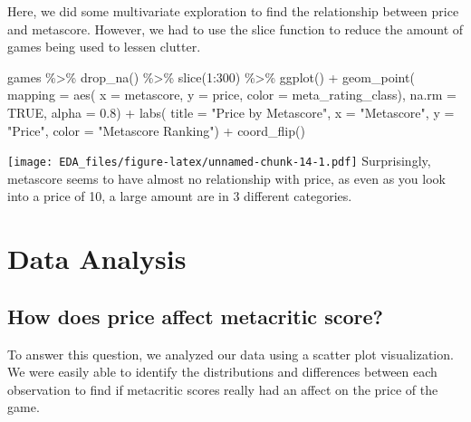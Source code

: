 \documentclass[
]{article}
\newenvironment{Shaded}{\begin{snugshade}}{\end{snugshade}}
\newcommand{\AttributeTok}[1]{\textcolor[rgb]{0.77,0.63,0.00}{#1}}
\newcommand{\ConstantTok}[1]{\textcolor[rgb]{0.00,0.00,0.00}{#1}}
\newcommand{\DecValTok}[1]{\textcolor[rgb]{0.00,0.00,0.81}{#1}}
\newcommand{\FloatTok}[1]{\textcolor[rgb]{0.00,0.00,0.81}{#1}}
\newcommand{\FunctionTok}[1]{\textcolor[rgb]{0.00,0.00,0.00}{#1}}
\newcommand{\NormalTok}[1]{#1}
\newcommand{\SpecialCharTok}[1]{\textcolor[rgb]{0.00,0.00,0.00}{#1}}
\newcommand{\StringTok}[1]{\textcolor[rgb]{0.31,0.60,0.02}{#1}}
\begin{document}
Here, we did some multivariate exploration to find the relationship
between price and metascore. However, we had to use the slice function
to reduce the amount of games being used to lessen clutter.

\begin{Shaded}
\begin{Highlighting}[]
\NormalTok{games }\SpecialCharTok{\%\textgreater{}\%} 
  \FunctionTok{drop\_na}\NormalTok{() }\SpecialCharTok{\%\textgreater{}\%}
  \FunctionTok{slice}\NormalTok{(}\DecValTok{1}\SpecialCharTok{:}\DecValTok{300}\NormalTok{) }\SpecialCharTok{\%\textgreater{}\%}
  \FunctionTok{ggplot}\NormalTok{() }\SpecialCharTok{+}
  \FunctionTok{geom\_point}\NormalTok{(}
    \AttributeTok{mapping =} \FunctionTok{aes}\NormalTok{(}
      \AttributeTok{x =}\NormalTok{ metascore, }
      \AttributeTok{y =}\NormalTok{ price, }
      \AttributeTok{color =}\NormalTok{ meta\_rating\_class),}
    \AttributeTok{na.rm =} \ConstantTok{TRUE}\NormalTok{,}
    \AttributeTok{alpha =} \FloatTok{0.8}\NormalTok{) }\SpecialCharTok{+}
  \FunctionTok{labs}\NormalTok{(}
    \AttributeTok{title =} \StringTok{"Price by Metascore"}\NormalTok{, }
    \AttributeTok{x =} \StringTok{"Metascore"}\NormalTok{,}
    \AttributeTok{y =} \StringTok{"Price"}\NormalTok{,}
    \AttributeTok{color =} \StringTok{"Metascore Ranking"}\NormalTok{) }\SpecialCharTok{+}
    \FunctionTok{coord\_flip}\NormalTok{()}
\end{Highlighting}
\end{Shaded}

\texttt{[image: EDA\_files/figure-latex/unnamed-chunk-14-1.pdf]}
Surprisingly, metascore seems to have almost no relationship with price,
as even as you look into a price of 10, a large amount are in 3
different categories.

\hypertarget{data-analysis}{%
\section{Data Analysis}\label{data-analysis}}

\hypertarget{how-does-price-affect-metacritic-score}{%
\subsection{How does price affect metacritic
score?}\label{how-does-price-affect-metacritic-score}}

To answer this question, we analyzed our data using a scatter plot
visualization. We were easily able to identify the distributions and
differences between each observation to find if metacritic scores really
had an affect on the price of the game.
\end{document}
